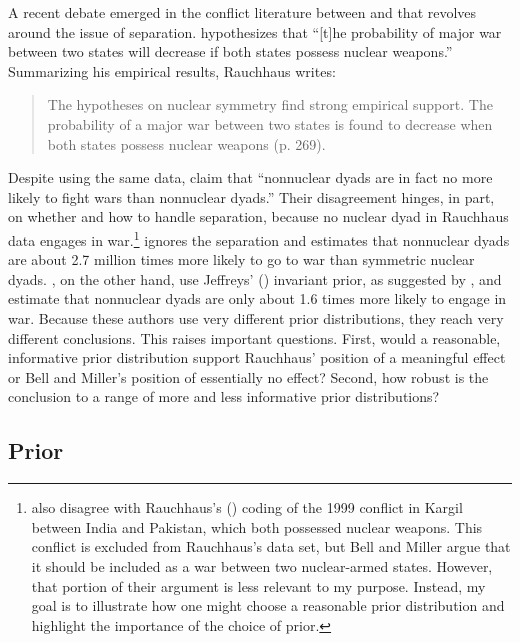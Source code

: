 \documentclass[12pt]{article}
\begin{document}
A recent debate emerged in the conflict literature between \cite{Rauchhaus2009} and \cite{BellMiller2014} that revolves around the issue of separation. \citet[p. 262]{Rauchhaus2009} hypothesizes that ``[t]he probability of major war between two states will decrease if both states possess nuclear weapons.'' Summarizing his empirical results, Rauchhaus writes:

\begin{quote} 
The hypotheses on nuclear symmetry find strong empirical support. The probability of a major war between two states is found to decrease when both states possess nuclear weapons (p. 269).
\end{quote}

Despite using the same data, \citet[p. 9]{BellMiller2014} claim that ``nonnuclear dyads are in fact no more likely to fight wars than nonnuclear dyads.'' Their disagreement hinges, in part, on whether and how to handle separation, because no nuclear dyad in Rauchhaus data engages in war.\footnote{\cite{BellMiller2014} also disagree with Rauchhaus's (\citeyear{Rauchhaus2009}) coding of the 1999 conflict in Kargil between India and Pakistan, which both possessed nuclear weapons. This conflict is excluded from Rauchhaus's data set, but Bell and Miller argue that it should be included as a war between two nuclear-armed states. However, that portion of their argument is less relevant to my purpose. Instead, my goal is to illustrate how one might choose a reasonable prior distribution and highlight the importance of the choice of prior.} \cite{Rauchhaus2009} ignores the separation and estimates that nonnuclear dyads are about 2.7 million times more likely to go to war than symmetric nuclear dyads. \cite{BellMiller2014}, on the other hand, use Jeffreys' (\citeyear{Jeffreys1946}) invariant prior, as suggested by \cite{Zorn2005}, and estimate that nonnuclear dyads are only about 1.6 times more likely to engage in war. Because these authors use very different prior distributions, they reach very different conclusions. This raises important questions. First, would a reasonable, informative prior distribution support Rauchhaus' position of a meaningful effect or Bell and Miller's position of essentially no effect? Second, how robust is the conclusion to a range of more and less informative prior distributions?

\subsection*{Prior}
\end{document}
